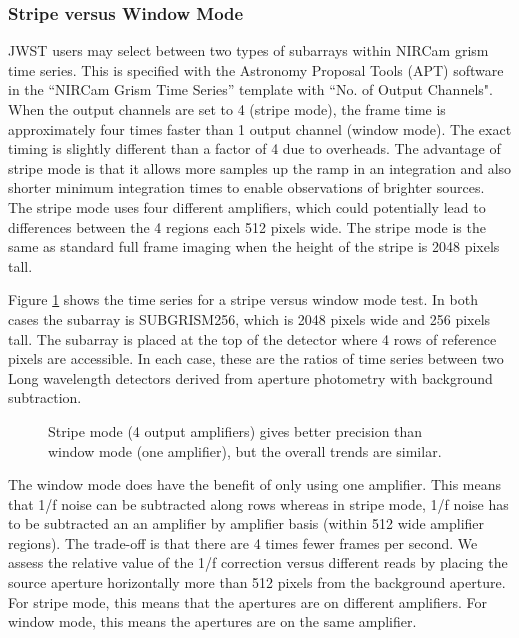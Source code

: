 \documentclass{aastex62}
\begin{document}
\clearpage

\subsubsection{Stripe versus Window Mode}
JWST users may select between two types of subarrays within NIRCam grism time series.
This is specified with the Astronomy Proposal Tools (APT) software in the ``NIRCam Grism Time Series'' template with ``No. of Output Channels".
When the output channels are set to 4 (stripe mode), the frame time is approximately four times faster than 1 output channel (window mode).
The exact timing is slightly different than a factor of 4 due to overheads.
The advantage of stripe mode is that it allows more samples up the ramp in an integration and also shorter minimum integration times to enable observations of brighter sources.
The stripe mode uses four different amplifiers, which could potentially lead to differences between the 4 regions each 512 pixels wide.
The stripe mode is the same as standard full frame imaging when the height of the stripe is 2048 pixels tall.

Figure \ref{fig:stripeVsWindowAZlab04} shows the time series for a stripe versus window mode test.
In both cases the subarray is SUBGRISM256, which is 2048 pixels wide and 256 pixels tall.
The subarray is placed at the top of the detector where 4 rows of reference pixels are accessible.
In each case, these are the ratios of time series between two Long wavelength detectors derived from aperture photometry with background subtraction.

\begin{figure}
{}
\caption{Stripe mode (4 output amplifiers) gives better precision than window mode (one amplifier), but the overall trends are similar.
}\label{fig:stripeVsWindowAZlab04}
\end{figure}

The window mode does have the benefit of only using one amplifier.
This means that 1/f noise can be subtracted along rows whereas in stripe mode, 1/f noise has to be subtracted an an amplifier by amplifier basis (within 512 wide amplifier regions).
The trade-off is that there are 4 times fewer frames per second.
We assess the relative value of the 1/f correction versus different reads by placing the source aperture horizontally more than 512 pixels from the background aperture.
For stripe mode, this means that the apertures are on different amplifiers.
For window mode, this means the apertures are on the same amplifier.
\end{document}
